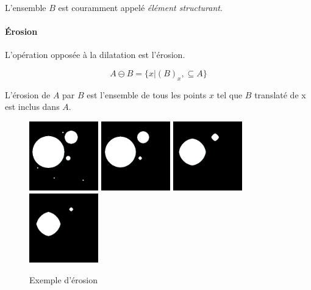  L'ensemble $B$ est couramment appelé \emph{élément structurant}.
  
  \paragraph{Érosion}
  
  L'opération opposée à la dilatation est l'érosion.
  
  \begin{equation}
    A \ominus B = \{x|(B)_x, \subseteq A\}
  \end{equation}
  
  L'érosion de $A$ par $B$ est l'ensemble de tous les points $x$ tel que $B$ translaté de x est inclus dans $A$. 
  
  \begin{figure}[h]
    \centering
    \includegraphics[height=3cm]{Images/morpho_init.png}
    \includegraphics[height=3cm]{Images/morpho_erode_k5.png}
    \includegraphics[height=3cm]{Images/morpho_erode_k21.png}
    \includegraphics[height=3cm]{Images/morpho_erode_k31.png}
    \label{fig:morpho_erosion}
    \caption{Exemple d'érosion}
  \end{figure}
  
